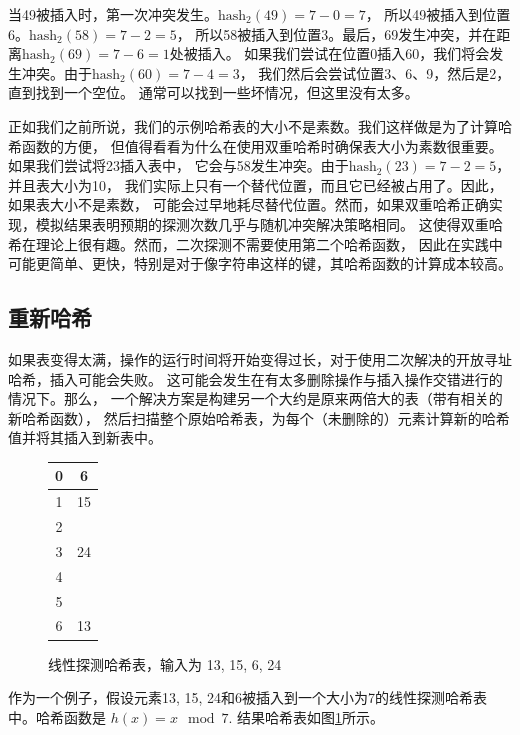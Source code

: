 \documentclass[a4paper]{ctexart}
\theoremstyle{definition}
\theoremstyle{definition}
\begin{document}
当49被插入时，第一次冲突发生。$\text{hash}_2(49) = 7 - 0 = 7$，
所以49被插入到位置6。$\text{hash}_2(58) = 7 - 2 = 5$，
所以58被插入到位置3。最后，69发生冲突，并在距离$\text{hash}_2(69) = 7 - 6 = 1$处被插入。
如果我们尝试在位置0插入60，我们将会发生冲突。由于$\text{hash}_2(60) = 7 - 4 = 3$，
我们然后会尝试位置3、6、9，然后是2，直到找到一个空位。
通常可以找到一些坏情况，但这里没有太多。

正如我们之前所说，我们的示例哈希表的大小不是素数。我们这样做是为了计算哈希函数的方便，
但值得看看为什么在使用双重哈希时确保表大小为素数很重要。如果我们尝试将23插入表中，
它会与58发生冲突。由于$\text{hash}_2(23) = 7 - 2 = 5$，并且表大小为10，
我们实际上只有一个替代位置，而且它已经被占用了。因此，如果表大小不是素数，
可能会过早地耗尽替代位置。然而，如果双重哈希正确实现，模拟结果表明预期的探测次数几乎与随机冲突解决策略相同。
这使得双重哈希在理论上很有趣。然而，二次探测不需要使用第二个哈希函数，
因此在实践中可能更简单、更快，特别是对于像字符串这样的键，其哈希函数的计算成本较高。

\subsection{重新哈希}

如果表变得太满，操作的运行时间将开始变得过长，对于使用二次解决的开放寻址哈希，插入可能会失败。
这可能会发生在有太多删除操作与插入操作交错进行的情况下。那么，
一个解决方案是构建另一个大约是原来两倍大的表（带有相关的新哈希函数），
然后扫描整个原始哈希表，为每个（未删除的）元素计算新的哈希值并将其插入到新表中。

\begin{figure}[htbp]
    \centering
    \begin{tabular}{|c|c|}
        \hline
        0 & 6 \\
        \hline
        1 & 15 \\
        \hline
        2 &  \\
        \hline
        3 & 24 \\
        \hline
        4 &  \\
        \hline
        5 &  \\
        \hline
        6 & 13 \\
        \hline
    \end{tabular}
    \caption{线性探测哈希表，输入为 13, 15, 6, 24}
    \label{fig:hash_table_1}
\end{figure}

作为一个例子，假设元素13, 15, 24和6被插入到一个大小为7的线性探测哈希表中。哈希函数是 $h(x) = x \mod 7$. 结果哈希表如图\ref{fig:hash_table_1}所示。
\end{document}
